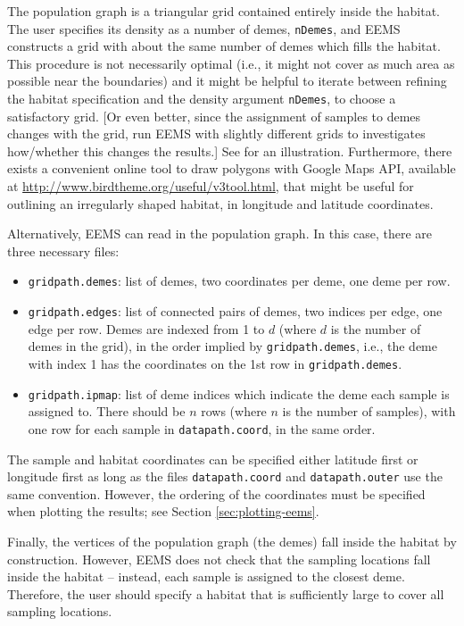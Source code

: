 \documentclass[a4paper,10pt,DIV=15,titlepage,mpinclude=true]{scrartcl}
\newcommand{\keystring}[1]{{\tt #1}}
\begin{document}
The population graph is a triangular grid contained entirely inside the habitat. The user specifies its density as a number of demes, \keystring{nDemes}, and EEMS constructs a grid with about the same number of demes which fills the habitat. This procedure is not necessarily optimal (i.e., it might not cover as much area as possible near the boundaries) and it might be helpful to iterate between refining the habitat specification and the density argument \keystring{nDemes}, to choose a satisfactory grid. [Or even better, since the assignment of samples to demes changes with the grid, run EEMS with slightly different grids to investigates how/whether this changes the results.] See  for an illustration. Furthermore, there exists a convenient online tool to draw polygons with Google Maps API, available at \url{http://www.birdtheme.org/useful/v3tool.html}, that might be useful for outlining an irregularly shaped habitat, in longitude and latitude coordinates.

Alternatively, EEMS can read in the population graph. In this case, there are three necessary files:
\begin{itemize}
  \item \keystring{gridpath.demes}: list of demes, two coordinates per deme, one deme per row.
  \item \keystring{gridpath.edges}: list of connected pairs of demes, two indices per edge, one edge per row. Demes are indexed from 1 to $d$ (where $d$ is the number of demes in the grid), in the order implied by \keystring{gridpath.demes}, i.e., the deme with index 1 has the coordinates on the 1st row in \keystring{gridpath.demes}.
  \item \keystring{gridpath.ipmap}: list of deme indices which indicate the deme each sample is assigned to. There should be $n$ rows (where $n$ is the number of samples), with one row for each sample in \keystring{datapath.coord}, in the same order.
\end{itemize}

The sample and habitat coordinates can be specified either latitude first or longitude first as long as the files \keystring{datapath.coord} and \keystring{datapath.outer} use the same convention. However, the ordering of the coordinates must be specified when plotting the results; see Section \ref{sec:plotting-eems}.

Finally, the vertices of the population graph (the demes) fall inside the habitat by construction. However, EEMS does not check that the sampling locations fall inside the habitat -- instead, each sample is assigned to the closest deme. Therefore, the user should specify a habitat that is sufficiently large to cover all sampling locations.
\end{document}
